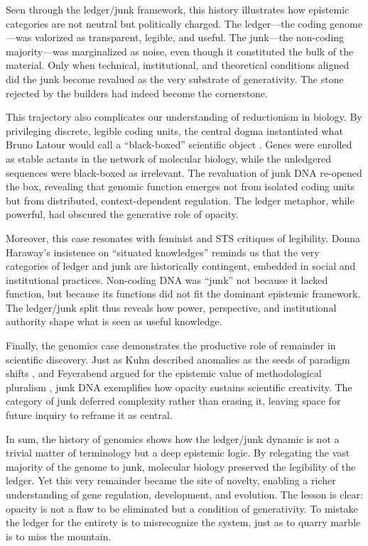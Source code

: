 \documentclass[12pt]{article}
\begin{document}
{{{Seen through the ledger/junk framework, this history illustrates how epistemic categories are not neutral but politically charged. The ledger---the coding genome---was valorized as transparent, legible, and useful. The junk---the non-coding majority---was marginalized as noise, even though it constituted the bulk of the material. Only when technical, institutional, and theoretical conditions aligned did the junk become revalued as the very substrate of generativity. The stone rejected by the builders had indeed become the cornerstone.

This trajectory also complicates our understanding of reductionism in biology. By privileging discrete, legible coding units, the central dogma instantiated what Bruno Latour would call a ``black-boxed'' scientific object \citep{latour1987}. Genes were enrolled as stable actants in the network of molecular biology, while the unledgered sequences were black-boxed as irrelevant. The revaluation of junk DNA re-opened the box, revealing that genomic function emerges not from isolated coding units but from distributed, context-dependent regulation. The ledger metaphor, while powerful, had obscured the generative role of opacity.

Moreover, this case resonates with feminist and STS critiques of legibility. Donna Haraway’s insistence on ``situated knowledges'' \citep{haraway1988} reminds us that the very categories of ledger and junk are historically contingent, embedded in social and institutional practices. Non-coding DNA was ``junk'' not because it lacked function, but because its functions did not fit the dominant epistemic framework. The ledger/junk split thus reveals how power, perspective, and institutional authority shape what is seen as useful knowledge.

Finally, the genomics case demonstrates the productive role of remainder in scientific discovery. Just as Kuhn described anomalies as the seeds of paradigm shifts \citep{kuhn1962}, and Feyerabend argued for the epistemic value of methodological pluralism \citep{feyerabend1975}, junk DNA exemplifies how opacity sustains scientific creativity. The category of junk deferred complexity rather than erasing it, leaving space for future inquiry to reframe it as central.

In sum, the history of genomics shows how the ledger/junk dynamic is not a trivial matter of terminology but a deep epistemic logic. By relegating the vast majority of the genome to junk, molecular biology preserved the legibility of the ledger. Yet this very remainder became the site of novelty, enabling a richer understanding of gene regulation, development, and evolution. The lesson is clear: opacity is not a flaw to be eliminated but a condition of generativity. To mistake the ledger for the entirety is to misrecognize the system, just as to quarry marble is to miss the mountain.

}}}
\end{document}
